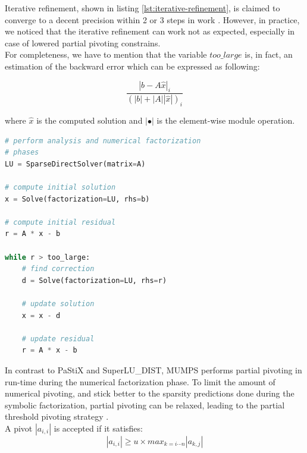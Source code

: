 Iterative refinement, shown in listing \ref{lst:iterative-refinement}, is claimed to converge to a  decent precision within 2 or 3 steps in work \cite{mm-backward-error}. However, in practice, we noticed that the iterative refinement can work not as expected, especially in case of lowered partial pivoting constrains.\\

For completeness, we have to mention that the variable $too\_large$ is, in fact, an estimation of the backward error \cite{mm-backward-error} which can be expressed as following:

\begin{equation}
\frac{|b - A\hat{x}|_{i}}{(|b| + |A| |\hat{x}|)_{i}}
\end{equation}

where $\hat{x}$ is the computed solution and $|\bullet|$ is the element-wise module operation.\\

 
\begin{minipage}{\linewidth}

\begin{lstlisting}[language=python, caption={A simple iterative refinement}, frame=single, label={lst:iterative-refinement}]
# perform analysis and numerical factorization 
# phases
LU = SparseDirectSolver(matrix=A)

# compute initial solution
x = Solve(factorization=LU, rhs=b)

# compute initial residual
r = A * x - b

while r > too_large:
	# find correction
	d = Solve(factorization=LU, rhs=r)
	
	# update solution
	x = x - d
	
	# update residual
	r = A * x - b
\end{lstlisting}
\end{minipage}


In contrast to PaStiX and SuperLU\_DIST, MUMPS performs partial pivoting in run-time during the numerical factorization phase. To limit the amount of numerical pivoting, and stick better to the
sparsity predictions done during the symbolic factorization, partial pivoting can be relaxed, leading to the partial threshold pivoting strategy \cite{mumps-manual}.\\

A pivot $|a_{i,i}|$ is accepted if it satisfies:\\
\begin{equation}\label{eq:lc-1}
|a_{i,i}| \geq u \times max_{k=i \cdots n} |a_{k,j}|
\end{equation}

